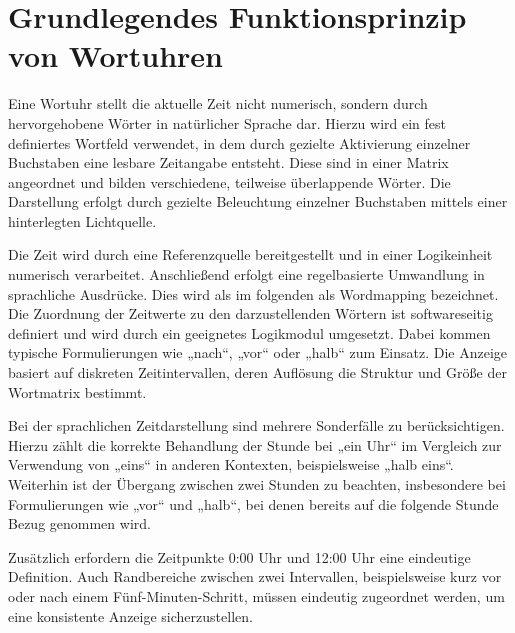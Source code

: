 \section{Grundlegendes Funktionsprinzip von Wortuhren}
Eine Wortuhr stellt die aktuelle Zeit nicht numerisch, sondern durch hervorgehobene Wörter in natürlicher Sprache dar. 
Hierzu wird ein fest definiertes Wortfeld verwendet, in dem durch gezielte Aktivierung einzelner Buchstaben eine lesbare Zeitangabe entsteht.
Diese sind in einer Matrix angeordnet und bilden verschiedene, teilweise überlappende Wörter. 
Die Darstellung erfolgt durch gezielte Beleuchtung einzelner Buchstaben mittels einer hinterlegten Lichtquelle.

Die Zeit wird durch eine Referenzquelle bereitgestellt und in einer Logikeinheit numerisch verarbeitet. 
Anschließend erfolgt eine regelbasierte Umwandlung in sprachliche Ausdrücke.
Dies wird als im folgenden als Wordmapping bezeichnet. 
Die Zuordnung der Zeitwerte zu den darzustellenden Wörtern ist softwareseitig definiert und wird durch ein geeignetes Logikmodul umgesetzt. 
Dabei kommen typische Formulierungen wie „nach“, „vor“ oder „halb“ zum Einsatz. 
Die Anzeige basiert auf diskreten Zeitintervallen, deren Auflösung die Struktur und Größe der Wortmatrix bestimmt.

Bei der sprachlichen Zeitdarstellung sind mehrere Sonderfälle zu berücksichtigen. 
Hierzu zählt die korrekte Behandlung der Stunde bei „ein Uhr“ im Vergleich zur Verwendung von „eins“ in anderen Kontexten, beispielsweise „halb eins“. 
Weiterhin ist der Übergang zwischen zwei Stunden zu beachten, insbesondere bei Formulierungen wie „vor“ und „halb“, bei denen bereits auf die folgende Stunde Bezug genommen wird.

Zusätzlich erfordern die Zeitpunkte 0:00 Uhr und 12:00 Uhr eine eindeutige Definition. 
Auch Randbereiche zwischen zwei Intervallen, beispielsweise kurz vor oder nach einem Fünf-Minuten-Schritt, müssen eindeutig zugeordnet werden, um eine konsistente Anzeige sicherzustellen.